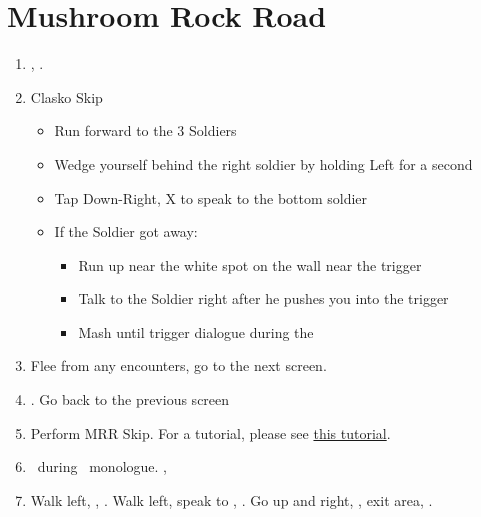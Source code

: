 \chapter{Mushroom Rock Road}

\begin{enumerate}
	\item \sd, \cs.
	\item Clasko Skip
	      \begin{itemize}
		      \item Run forward to the 3 Soldiers
		      \item Wedge yourself behind the right soldier by holding Left for a second
		      \item Tap Down-Right, X to speak to the bottom soldier
		      \item If the Soldier got away:
		            \begin{itemize}
			            \item Run up near the white spot on the wall near the trigger
			            \item Talk to the Soldier right after he pushes you into the trigger
			            \item Mash until trigger dialogue during the \cs
		            \end{itemize}
	      \end{itemize}
	\item Flee from any encounters, go to the next screen.
	\item \save. Go back to the previous screen
	\item Perform MRR Skip. For a tutorial, please see \href{https://www.youtube.com/watch?v=SSnxE6Xzvkk}{this tutorial}.
	\item \sd\ during \tidus\ monologue. \cs[1:00], \sd
	\item Walk left, \save, \sd. Walk left, speak to \auron, \sd. Go up and right, \sd, exit area, \sd.
\end{enumerate}
\bothvfill\winvfill\lossvfill
\ 
\bothcb\wincb\losscb
